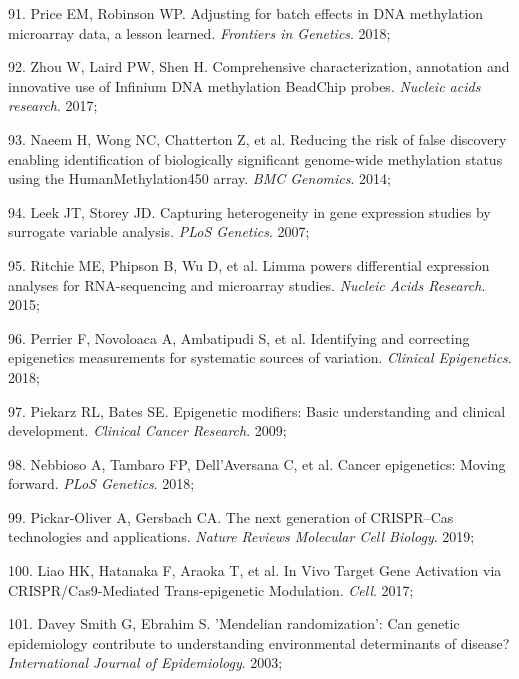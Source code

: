 \documentclass[11pt,twoside]{bristolthesis}
\newenvironment{cslreferences}%
  {}%
  {\par}
\begin{document}
\begin{cslreferences}
\leavevmode\hypertarget{ref-Price2018}{}%
91. Price EM, Robinson WP. Adjusting for batch effects in DNA methylation microarray data, a lesson learned. \emph{Frontiers in Genetics}. 2018;

\leavevmode\hypertarget{ref-Zhou2017}{}%
92. Zhou W, Laird PW, Shen H. Comprehensive characterization, annotation and innovative use of Infinium DNA methylation BeadChip probes. \emph{Nucleic acids research}. 2017;

\leavevmode\hypertarget{ref-Naeem2014}{}%
93. Naeem H, Wong NC, Chatterton Z, et al. Reducing the risk of false discovery enabling identification of biologically significant genome-wide methylation status using the HumanMethylation450 array. \emph{BMC Genomics}. 2014;

\leavevmode\hypertarget{ref-Leek2007}{}%
94. Leek JT, Storey JD. Capturing heterogeneity in gene expression studies by surrogate variable analysis. \emph{PLoS Genetics}. 2007;

\leavevmode\hypertarget{ref-Ritchie2015}{}%
95. Ritchie ME, Phipson B, Wu D, et al. Limma powers differential expression analyses for RNA-sequencing and microarray studies. \emph{Nucleic Acids Research}. 2015;

\leavevmode\hypertarget{ref-Perrier2018}{}%
96. Perrier F, Novoloaca A, Ambatipudi S, et al. Identifying and correcting epigenetics measurements for systematic sources of variation. \emph{Clinical Epigenetics}. 2018;

\leavevmode\hypertarget{ref-Piekarz2009}{}%
97. Piekarz RL, Bates SE. Epigenetic modifiers: Basic understanding and clinical development. \emph{Clinical Cancer Research}. 2009;

\leavevmode\hypertarget{ref-Nebbioso2018}{}%
98. Nebbioso A, Tambaro FP, Dell'Aversana C, et al. Cancer epigenetics: Moving forward. \emph{PLoS Genetics}. 2018;

\leavevmode\hypertarget{ref-Pickar-Oliver2019}{}%
99. Pickar-Oliver A, Gersbach CA. The next generation of CRISPR--Cas technologies and applications. \emph{Nature Reviews Molecular Cell Biology}. 2019;

\leavevmode\hypertarget{ref-Liao2017}{}%
100. Liao HK, Hatanaka F, Araoka T, et al. In Vivo Target Gene Activation via CRISPR/Cas9-Mediated Trans-epigenetic Modulation. \emph{Cell}. 2017;

\leavevmode\hypertarget{ref-DaveySmith2003}{}%
101. Davey Smith G, Ebrahim S. 'Mendelian randomization': Can genetic epidemiology contribute to understanding environmental determinants of disease? \emph{International Journal of Epidemiology}. 2003;


\end{cslreferences}
\end{document}
